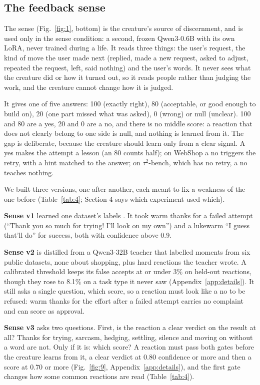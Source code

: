 \subsection{The feedback sense}

The sense (Fig.~\ref{fig:1}, bottom) is the creature's source of discernment, and is used only in the sense condition: a second, frozen Qwen3-0.6B with its own LoRA, never trained during a life. It reads three things: the user's request, the kind of move the user made next (replied, made a new request, asked to adjust, repeated the request, left, said nothing) and the user's words. It never sees what the creature did or how it turned out, so it reads people rather than judging the work, and the creature cannot change how it is judged.

It gives one of five answers: 100 (exactly right), 80 (acceptable, or good enough to build on), 20 (one part missed what was asked), 0 (wrong) or null (unclear). 100 and 80 are a yes, 20 and 0 are a no, and there is no middle score: a reaction that does not clearly belong to one side is null, and nothing is learned from it. The gap is deliberate, because the creature should learn only from a clear signal. A yes makes the attempt a lesson (an 80 counts half); on WebShop a no triggers the retry, with a hint matched to the answer; on $\tau^2$-bench, which has no retry, a no teaches nothing.

We built three versions, one after another, each meant to fix a weakness of the one before (Table~\ref{tab:4}; Section 4 says which experiment used which).

\textbf{Sense v1} learned one dataset's labels \cite{peng2026wildreward}. It took warm thanks for a failed attempt (``Thank you so much for trying! I'll look on my own'') and a lukewarm ``I guess that'll do'' for success, both with confidence above 0.9.

\textbf{Sense v2} is distilled \cite{hinton2015distilling} from a Qwen3-32B teacher that labelled moments from six public datasets, none about shopping, plus hard reactions the teacher wrote. A calibrated threshold keeps its false accepts at or under 3\% on held-out reactions, though they rose to 8.1\% on a task type it never saw (Appendix~\ref{app:details}). It still asks a single question, which score, so a reaction must look like a no to be refused: warm thanks for the effort after a failed attempt carries no complaint and can score as approval.

\textbf{Sense v3} asks two questions. First, is the reaction a clear verdict on the result at all? Thanks for trying, sarcasm, hedging, settling, silence and moving on without a word are not. Only if it is: which score? A reaction must pass both gates before the creature learns from it, a clear verdict at 0.80 confidence or more and then a score at 0.70 or more (Fig.~\ref{fig:9}, Appendix~\ref{app:details}), and the first gate changes how some common reactions are read (Table~\ref{tab:4}).

